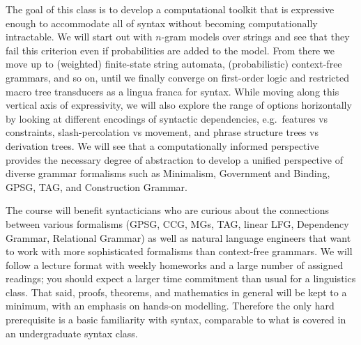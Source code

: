 The goal of this class is to develop a computational toolkit that is expressive enough to accommodate all of syntax without becoming computationally intractable.
We will start out with $n$-gram models over strings and see that they fail this criterion even if probabilities are added to the model.
From there we move up to (weighted) finite-state string automata, (probabilistic) context-free grammars, and so on, until we finally converge on first-order logic and restricted macro tree transducers as a lingua franca for syntax.
While moving along this vertical axis of expressivity, we will also explore the range of options horizontally by looking at different encodings of syntactic dependencies, e.g.\ features vs constraints, slash-percolation vs movement, and phrase structure trees vs derivation trees.
We will see that a computationally informed perspective provides the necessary degree of abstraction to develop a unified perspective of diverse grammar formalisms such as Minimalism, Government and Binding, GPSG, TAG, and Construction Grammar.

The course will benefit syntacticians who are curious about the connections between various formalisms (GPSG, CCG, MGs, TAG, linear LFG, Dependency Grammar, Relational Grammar) as well as natural language engineers that want to work with more sophisticated formalisms than context-free grammars.
We will follow a lecture format with weekly homeworks and a large number of assigned readings; you should expect a larger time commitment than usual for a linguistics class.
That said, proofs, theorems, and mathematics in general will be kept to a minimum, with an emphasis on hands-on modelling. Therefore the only hard prerequisite is a basic familiarity with syntax, comparable to what is covered in an undergraduate syntax class.


